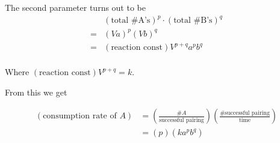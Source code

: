 \documentclass[12pt,twoside]{article}
\begin{document}
The second parameter turns out to be
\begin{equation}
  \begin{aligned}
    &{\left(\text{total \# A's}\right)}^p \cdot {\left(\text{total \# B's}\right)}^q \\
    = &{(Va)}^p{(Vb)}^q \\
    = & \left(\text{reaction const}\right)V^{p+q} a^p b^q \\
  \end{aligned}
\end{equation}

Where $\left(\text{reaction const}\right)V^{p+q} = k$.

From this we get

\begin{equation}
  \begin{aligned}
    \left(\text{consumption rate of }A\right) &= \left(\frac{\text{\# }A}{\text{successful pairing}}\right)
    \left(\frac{\text{\# successful pairing}}{\text{time}}\right) \\
    &= (p) (ka^{p} b^q) \\
  \end{aligned}
\end{equation}
\end{document}
